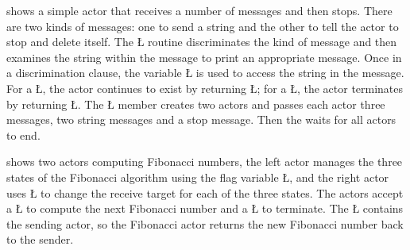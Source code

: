\documentclass[openright,twoside]{report}
\begin{document}
 shows a simple actor that receives a number of messages and then stops.
There are two kinds of messages: one to send a string and the other to tell the actor to stop and delete itself.
The \LGinlinetrue\LGbegin\lgrinde\L{}\endlgrinde\LGend{} routine discriminates the kind of message and then examines the string within the message to print an appropriate message.
Once in a discrimination clause, the variable \LGinlinetrue\LGbegin\lgrinde\L{}\endlgrinde\LGend{} is used to access the string in the message.
For a \LGinlinetrue\LGbegin\lgrinde\L{}\endlgrinde\LGend{}, the actor continues to exist by returning \LGinlinetrue\LGbegin\lgrinde\L{}\endlgrinde\LGend{};
for a \LGinlinetrue\LGbegin\lgrinde\L{}\endlgrinde\LGend{}, the actor terminates by returning \LGinlinetrue\LGbegin\lgrinde\L{}\endlgrinde\LGend{}.
The \LGinlinetrue\LGbegin\lgrinde\L{}\endlgrinde\LGend{} member creates two actors and passes each actor three messages, two string messages and a stop message.
Then the  waits for all actors to end.

 shows two actors computing Fibonacci numbers, the left actor manages the three states of the Fibonacci algorithm using the flag variable \LGinlinetrue\LGbegin\lgrinde\L{}\endlgrinde\LGend{}, and the right actor uses \LGinlinetrue\LGbegin\lgrinde\L{}\endlgrinde\LGend{} to change the receive target for each of the three states.
The actors accept a \LGinlinetrue\LGbegin\lgrinde\L{}\endlgrinde\LGend{} to compute the next Fibonacci number and a \LGinlinetrue\LGbegin\lgrinde\L{}\endlgrinde\LGend{} to terminate.
The \LGinlinetrue\LGbegin\lgrinde\L{}\endlgrinde\LGend{} contains the sending actor, so the Fibonacci actor returns the new Fibonacci number back to the sender.
\end{document}

